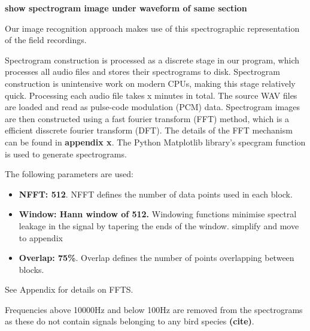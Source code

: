 \textbf{show spectrogram image under waveform of same section}

Our image recognition approach makes use of this spectrographic representation
of the field recordings.

Spectrogram construction is processed as a discrete stage in our program, which
processes all audio files and stores their spectrograms to disk.
Spectrogram construction is unintensive work on modern CPUs, making this stage
relatively quick.
Processing each audio file takes x minutes in total.
The source WAV files are loaded and read as pulse-code modulation (PCM) data.
Spectrogram images are then constructed using a fast fourier transform (FFT) method,
which is a efficient disscrete fourier transform (DFT).
The details of the FFT mechanism can be found in \textbf{appendix x}.
The Python Matplotlib library's specgram function is used to generate spectrograms.

The following parameters are used:
\begin{itemize}[noitemsep]
  \item \textbf{NFFT: 512}.
    NFFT defines the number of data points used in each block.
  \item \textbf{Window: Hann window of 512.}
    Windowing functions minimise spectral leakage in the signal by tapering the ends
    of the window.
    simplify and move to appendix
  \item \textbf{Overlap: 75\%}.
    Overlap defines the number of points overlapping between blocks.
\end{itemize}

See Appendix for details on FFTS.

Frequencies above 10000Hz and below 100Hz are removed from the spectrograms as these do
not contain signals belonging to any bird species \textbf{(cite)}.

